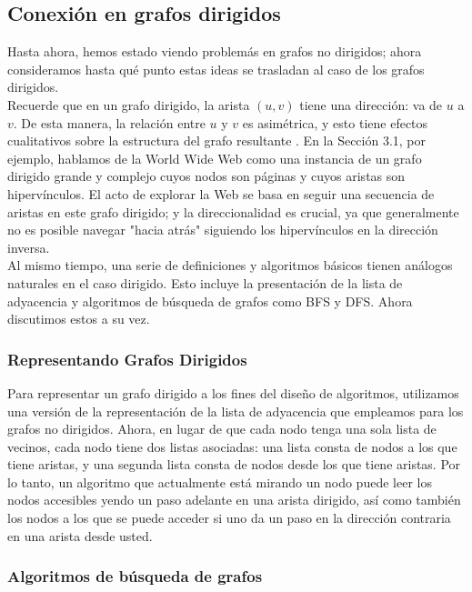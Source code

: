 \documentclass[a4paper]{article}
\begin{document}
\subsection{Conexión en grafos dirigidos}

Hasta ahora, hemos estado viendo problemás en grafos no dirigidos; ahora consideramos hasta qué punto estas ideas se trasladan al caso de los grafos dirigidos.\\

Recuerde que en un grafo dirigido, la arista $(u, v)$ tiene una dirección: va de $u$ a $v$. De esta manera, la relación entre $u$ y $v$ es asimétrica, y esto tiene efectos cualitativos sobre la estructura del grafo resultante . En la Sección 3.1, por ejemplo, hablamos de la World Wide Web como una instancia de un grafo dirigido grande y complejo cuyos nodos son páginas y cuyos aristas son hipervínculos. El acto de explorar la Web se basa en seguir una secuencia de aristas en este grafo dirigido; y la direccionalidad es crucial, ya que generalmente no es posible navegar "hacia atrás" siguiendo los hipervínculos en la dirección inversa.\\

Al mismo tiempo, una serie de definiciones y algoritmos básicos tienen análogos naturales en el caso dirigido. Esto incluye la presentación de la lista de adyacencia y algoritmos de búsqueda de grafos como BFS y DFS. Ahora discutimos estos a su vez.\\

\subsubsection*{Representando Grafos Dirigidos}

Para representar un grafo dirigido a los fines del diseño de algoritmos, utilizamos una versión de la representación de la lista de adyacencia que empleamos para los grafos no dirigidos. Ahora, en lugar de que cada nodo tenga una sola lista de vecinos, cada nodo tiene dos listas asociadas: una lista consta de nodos a los que tiene aristas, y una segunda lista consta de nodos desde los que tiene aristas. Por lo tanto, un algoritmo que actualmente está mirando un nodo puede leer los nodos accesibles yendo un paso adelante en una arista dirigido, así como también los nodos a los que se puede acceder si uno da un paso en la dirección contraria en una arista desde usted.\\

\subsubsection*{Algoritmos de búsqueda de grafos}
\end{document}
